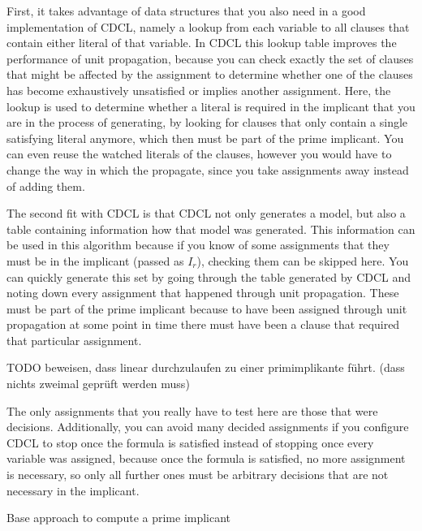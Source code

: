 First, it takes advantage of data structures that you also need in a good implementation of CDCL, namely a lookup from each variable to all clauses that contain either literal of that variable. In CDCL this lookup table improves the performance of unit propagation, because you can check exactly the set of clauses that might be affected by the assignment to determine whether one of the clauses has become exhaustively unsatisfied or implies another assignment. Here, the lookup is used to determine whether a literal is required in the implicant that you are in the process of generating, by looking for clauses that only contain a single satisfying literal anymore, which then must be part of the prime implicant. You can even reuse the watched literals of the clauses, however you would have to change the way in which the propagate, since you take assignments away instead of adding them.

The second fit with CDCL is that CDCL not only generates a model, but also a table containing information how that model was generated. This information can be used in this algorithm because if you know of some assignments that they must be in the implicant (passed as $I_r$), checking them can be skipped here. You can quickly generate this set by going through the table generated by CDCL and noting down every assignment that happened through unit propagation. These must be part of the prime implicant because to have been assigned through unit propagation at some point in time there must have been a clause that required that particular assignment. 

TODO beweisen, dass linear durchzulaufen zu einer primimplikante führt. (dass nichts zweimal geprüft werden muss)

The only assignments that you really have to test here are those that were decisions. Additionally, you can avoid many decided assignments if you configure CDCL to stop once the formula is satisfied instead of stopping once every variable was assigned, because once the formula is satisfied, no more assignment is necessary, so only all further ones must be arbitrary decisions that are not necessary in the implicant. 

\begin{algorithm}
\caption{{\sc Base approach to compute a prime implicant }}
\DontPrintSemicolon
{}

\;

\end{algorithm}

